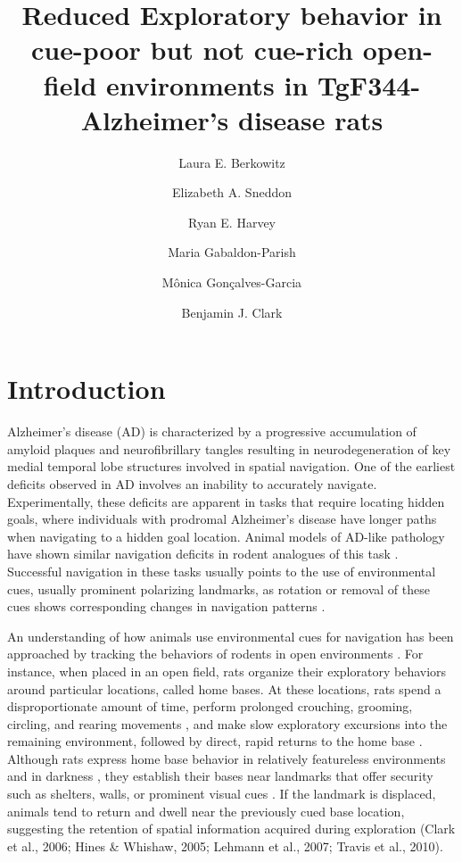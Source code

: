 \documentclass[fleqn,10pt]{wlscirep}
\title{Reduced Exploratory behavior in cue-poor but not cue-rich open-field environments in TgF344-Alzheimer’s disease rats}
\author[1,*]{Laura E. Berkowitz}
\author[1]{Elizabeth A. Sneddon}
\author[1]{Ryan E. Harvey}
\author[1]{Maria Gabaldon-Parish}
\author[1]{M\^{o}nica Gon\c{c}alves-Garcia}
\author[1,*]{Benjamin J. Clark}
\affil[1]{University of New Mexico, Psychology, Albuquerque, NM 87131, United States}
\affil[*]{bnjclark@unm.edu, lberkowitz@unm.edu}
\begin{document}
\flushbottom
\maketitle
%
%
\thispagestyle{empty}

\section*{Introduction}

Alzheimer’s disease (AD) is characterized by a progressive accumulation of amyloid plaques and neurofibrillary tangles resulting in neurodegeneration of key medial temporal lobe structures involved in spatial navigation. One of the earliest deficits observed in AD involves an inability to accurately navigate. Experimentally, these deficits are apparent in tasks that require locating hidden goals, where individuals with prodromal Alzheimer's disease have longer paths when navigating to a hidden goal location. Animal models of AD-like pathology have shown similar navigation deficits in rodent analogues of this task \cite{berkowitz_progressive_2018,janus_search_2004}. Successful navigation in these tasks usually points to the use of environmental cues, usually prominent polarizing landmarks, as rotation or removal of these cues shows corresponding changes in navigation patterns \cite{}. 

An understanding of how animals use environmental cues for navigation has been approached by tracking the behaviors of rodents in open environments \cite{dudchenko_neuroethology_2018,poulter_neurobiology_2018,thompson_behavioral_2018}. For instance, when placed in an open field, rats organize their exploratory behaviors around particular locations, called home bases. At these locations, rats spend a disproportionate amount of time, perform prolonged crouching, grooming, circling, and rearing movements \cite{eilam_home_1989}, and make slow exploratory excursions into the remaining environment, followed by direct, rapid returns to the home base \cite{wallace_nmda_2003}. Although rats express home base behavior in relatively featureless environments and in darkness \cite{eilam_home_1989,hines_home_2005,nemati_point_2007}, they establish their bases near landmarks that offer security such as shelters, walls, or prominent visual cues \cite{clark_impaired_2005,hines_home_2005,lehmann_complete_2007,wallace_nmda_2003,whishaw_exploratory_2006}. If the landmark is displaced, animals tend to return and dwell near the previously cued base location, suggesting the retention of spatial information acquired during exploration \cite{clark_impaired_2005,hines_home_2005,lehmann_complete_2007}(Clark et al., 2006; Hines \& Whishaw, 2005; Lehmann et al., 2007; Travis et al., 2010). 
\end{document}
